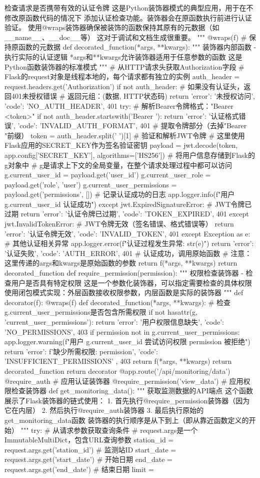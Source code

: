 {{{{{{检查请求是否携带有效的认证令牌 这是Python装饰器模式的典型应用，用于在不修改原函数代码的情况下 添加认证检查功能。装饰器会在原函数执行前进行认证验证。 使用@wraps装饰器确保被装饰的函数保持其原有的元数据（如__name__、__doc__等） 这对于调试和文档生成很重要。 """ @wraps(f) # 保持原函数的元数据 def decorated_function(*args, **kwargs): """ 装饰器内部函数 - 执行实际的认证逻辑 *args和**kwargs允许装饰器适用于任意参数的函数 这是Python函数装饰器的标准模式 """ # 从HTTP请求头获取Authorization字段 # Flask的request对象是线程本地的，每个请求都有独立的实例 auth_header = request.headers.get('Authorization') if not auth_header: # 如果没有认证头，返回401未授权错误 # 返回元组：(数据, HTTP状态码) return {'error': '未授权访问', 'code': 'NO_AUTH_HEADER'}, 401 try: # 解析Bearer令牌格式："Bearer <token>" if not auth_header.startswith('Bearer '): return {'error': '认证格式错误', 'code': 'INVALID_AUTH_FORMAT'}, 401 # 提取令牌部分（去掉"Bearer "前缀） token = auth_header.split(' ')[1] # 验证和解析JWT令牌 # 这里使用Flask应用的SECRET_KEY作为签名验证密钥 payload = jwt.decode(token, app.config['SECRET_KEY'], algorithms=['HS256']) # 将用户信息存储到Flask的g对象中 # g是请求上下文的全局变量，在整个请求处理过程中都可以访问 g.current_user_id = payload.get('user_id') g.current_user_role = payload.get('role', 'user') g.current_user_permissions = payload.get('permissions', []) # 记录认证成功的日志 app.logger.info(f"用户 {g.current_user_id} 认证成功") except jwt.ExpiredSignatureError: # JWT令牌已过期 return {'error': '认证令牌已过期', 'code': 'TOKEN_EXPIRED'}, 401 except jwt.InvalidTokenError: # JWT令牌无效（签名错误、格式错误等） return {'error': '认证令牌无效', 'code': 'INVALID_TOKEN'}, 401 except Exception as e: # 其他认证相关异常 app.logger.error(f"认证过程发生异常: {str(e)}") return {'error': '认证失败', 'code': 'AUTH_ERROR'}, 401 # 认证成功，调用原始函数 # 注意：这里传递的args和kwargs是原始函数的参数 return f(*args, **kwargs) return decorated_function def require_permission(permission): """ 权限检查装饰器 - 检查用户是否具有特定权限 这是一个参数化装饰器，可以指定需要检查的具体权限 使用闭包模式实现：外层函数接收权限参数，内层函数是实际的装饰器 """ def decorator(f): @wraps(f) def decorated_function(*args, **kwargs): # 检查g.current_user_permissions是否包含所需权限 if not hasattr(g, 'current_user_permissions'): return {'error': '用户权限信息缺失', 'code': 'NO_PERMISSIONS'}, 403 if permission not in g.current_user_permissions: app.logger.warning(f"用户 {g.current_user_id} 尝试访问权限 {permission} 被拒绝") return { 'error': f'缺少所需权限: {permission}', 'code': 'INSUFFICIENT_PERMISSIONS' }, 403 return f(*args, **kwargs) return decorated_function return decorator @app.route('/api/monitoring/data') @require_auth # 应用认证装饰器 @require_permission('view_data') # 应用权限检查装饰器 def get_monitoring_data(): """ 获取监测数据的API端点 这个函数展示了Flask装饰器的链式使用： 1. 首先执行@require_permission装饰器（因为它在内层） 2. 然后执行@require_auth装饰器 3. 最后执行原始的get_monitoring_data函数 装饰器的执行顺序是从下到上（即从靠近函数定义的开始） """ try: # 从请求参数获取查询条件 # request.args是一个ImmutableMultiDict，包含URL查询参数 station_id = request.args.get('station_id') # 监测站ID start_date = request.args.get('start_date') # 开始日期 end_date = request.args.get('end_date') # 结束日期 limit = }}}}}}
